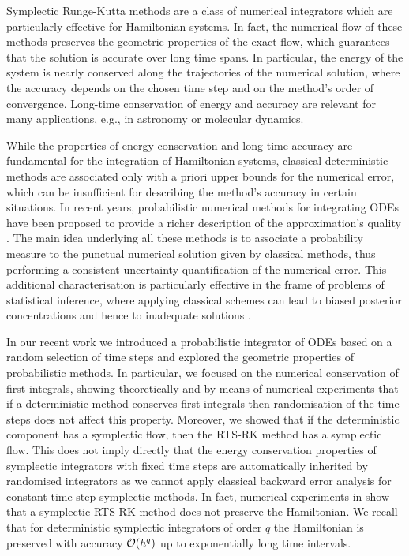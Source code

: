 \documentclass[10pt]{article}
\begin{document}
Symplectic Runge-Kutta methods are a class of numerical integrators which are particularly effective for Hamiltonian systems. In fact, the numerical flow of these methods preserves the geometric properties of the exact flow, which guarantees that the solution is accurate over long time spans. In particular, the energy of the system is nearly conserved along the trajectories of the numerical solution, where the accuracy depends on the chosen time step and on the method's order of convergence. Long-time conservation of energy and accuracy are relevant for many applications, e.g., in astronomy or molecular dynamics.

While the properties of energy conservation and long-time accuracy are fundamental for the integration of Hamiltonian systems, classical deterministic methods are associated only with a priori upper bounds for the numerical error, which can be insufficient for describing the method's accuracy in certain situations. In recent years, probabilistic numerical methods for integrating ODEs have been proposed  to provide a richer description of the approximation's quality \cite{AbG18, CGS16, KeH16, CCC16, SSH18}. The main idea underlying all these methods is to associate a probability measure to the punctual numerical solution given by classical methods, thus performing a consistent uncertainty quantification of the numerical error. This additional characterisation is particularly effective in the frame of problems of statistical inference, where applying classical schemes can lead to biased posterior concentrations and hence to inadequate solutions \cite{AbG18, COS17, CGS16}.

In our recent work \cite{AbG18} we introduced a probabilistic integrator of ODEs based on a random selection of time steps and explored the geometric properties of probabilistic methods. In particular, we focused on the numerical conservation of first integrals, showing theoretically and by means of numerical experiments that if a deterministic method conserves first integrals then randomisation of the time steps does not affect this property. Moreover, we showed that if the deterministic component has a symplectic flow, then the RTS-RK method has a symplectic flow. This does not imply directly that the energy conservation properties of symplectic integrators with fixed time steps are automatically inherited by randomised integrators as we cannot apply classical backward error analysis for constant time step symplectic methods. In fact, numerical experiments in \cite{AbG18} show that a symplectic RTS-RK method does not preserve the Hamiltonian. We recall that for deterministic symplectic integrators of order $q$ the Hamiltonian is preserved with accuracy $\mathcal{O}(h^q)$ up to exponentially long time intervals.
\end{document}
